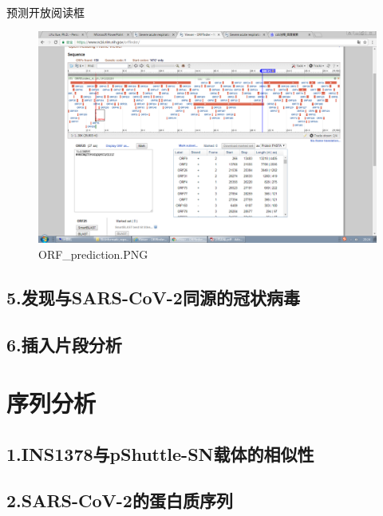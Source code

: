 \documentclass[supercite]{HustGraduPaper}
\begin{document}
	\paragraph{}\label{subpara:subpara}预测开放阅读框
	\begin{figure}[H]
		\centering
		\includegraphics[width=1\textwidth]{./material/practice1/ORF.PNG}
    \caption{ORF\_prediction.PNG}
  \end{figure}
  \subsection{5.发现与SARS-CoV-2同源的冠状病毒}

  \subsection{6.插入片段分析}

	\section{序列分析}
	\subsection{1.INS1378与pShuttle-SN载体的相似性}

	\subsection{2.SARS-CoV-2的蛋白质序列}
\end{document}
